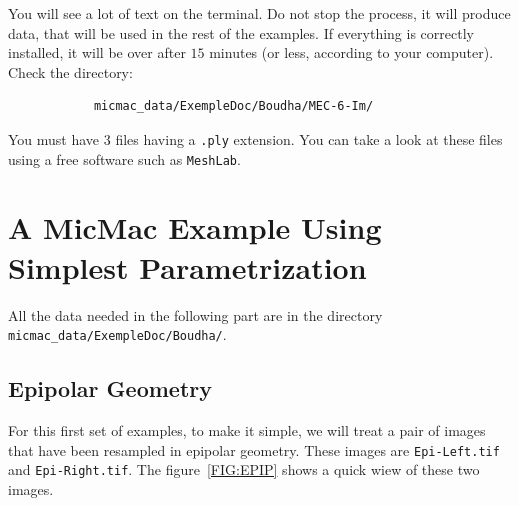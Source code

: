 You will see a lot of text on the terminal. %
Do not stop the process, it will
produce data, that will be used in the rest of the examples.
If everything is correctly installed, it will be over after $15$ minutes
(or less, according to your computer). Check the directory:

\begin{center}
\begin{verbatim}
            micmac_data/ExempleDoc/Boudha/MEC-6-Im/
\end{verbatim}
\end{center}

You must have $3$ files having a {\tt .ply} extension. You can take a look at these files
using a free software such as {\tt MeshLab}.





\section{A MicMac Example Using Simplest Parametrization}

All the data needed in the following part are in the directory
{\tt micmac\_data/ExempleDoc/Boudha/}.


\subsection{Epipolar Geometry}

For this first set of examples, to make it simple, we will treat
a pair of images that have been resampled in epipolar geometry.
These images are {\tt Epi-Left.tif} and {\tt Epi-Right.tif}.
The figure~\ref{FIG:EPIP} shows a quick wiew of these two images.


